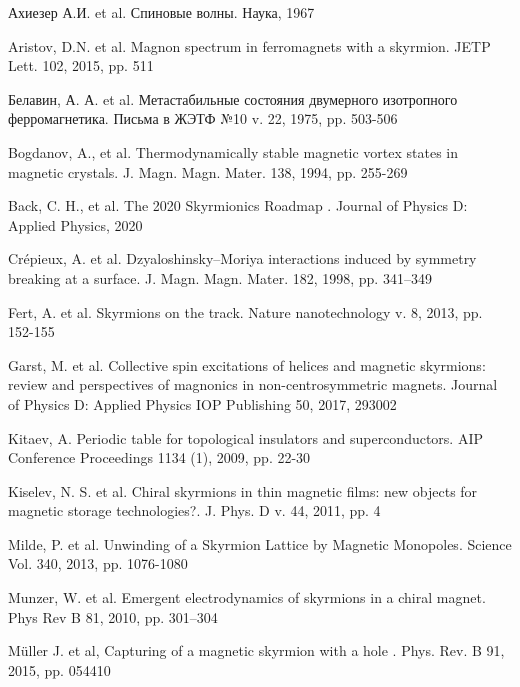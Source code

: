 \documentclass[a4paper,article,14pt]{extarticle}
\begin{document}
\pagebreak
{}
\pagebreak
\begin{thebibliography}{1}
 Ахиезер А.И. et al. \flqq Спиновые волны\frqq. Наука, 1967

 Aristov, D.N. et al. \flqq Magnon spectrum in ferromagnets with a skyrmion\frqq. JETP Lett. 102, 2015, pp. 511

 Белавин, А. А. et al. \flqq Метастабильные состояния двумерного изотропного ферромагнетика\frqq. Письма в ЖЭТФ №10 v. 22, 1975, pp. 503-506

 Bogdanov, A., et al. \flqq Thermodynamically stable magnetic vortex states in magnetic crystals\frqq. J. Magn. Magn. Mater. 138, 1994, pp. 255-269
 
 Back, C. H., et al.  \flqq The 2020 Skyrmionics Roadmap \frqq. Journal of Physics D: Applied Physics, 2020

 Crépieux, A. et al. \flqq Dzyaloshinsky–Moriya interactions induced by symmetry breaking at a surface\frqq.  J. Magn. Magn. Mater. 182, 1998, pp. 341–349

 Fert, A. et al. \flqq Skyrmions on the track\frqq. Nature nanotechnology v. 8, 2013, pp. 152-155

 Garst, M. et al. \flqq Collective spin excitations of helices and magnetic skyrmions: review and perspectives of magnonics in non-centrosymmetric magnets\frqq. Journal of Physics D: Applied Physics IOP Publishing 50, 2017, 293002

 Kitaev, A. \flqq Periodic table for topological insulators and superconductors\frqq. AIP Conference Proceedings 1134 (1), 2009, pp. 22-30

 Kiselev, N. S. et al. \flqq Chiral skyrmions in thin magnetic films: new objects for magnetic storage technologies?\frqq. J. Phys. D v. 44, 2011, pp. 4

 Milde, P. et al. \flqq Unwinding of a Skyrmion Lattice by Magnetic Monopoles\frqq. Science Vol. 340, 2013, pp. 1076-1080

 Munzer, W. et al. \flqq Emergent electrodynamics of skyrmions in a chiral magnet\frqq. Phys Rev B 81, 2010, pp. 301–304

 Müller J. et al, \flqq Capturing of a magnetic skyrmion with a hole \flqq. Phys. Rev. B 91, 2015, pp. 054410


\end{thebibliography}
\end{document}
